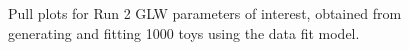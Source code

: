 \begin{figure}
\begin{tabular}{c}
  \end{tabular}
  \caption{Pull plots for Run 2 GLW parameters of interest, obtained from generating and fitting 1000 toys using the data fit model.}
\label{fig:GLW_run2_pulls}
\end{figure}
